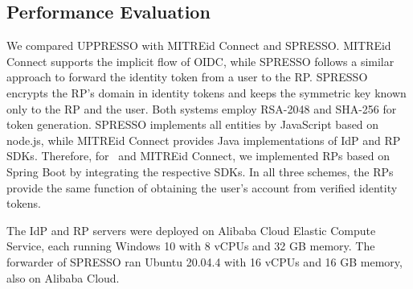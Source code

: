 \subsection{Performance Evaluation}
\label{sec:evaluation}


 We compared UPPRESSO with MITREid Connect and SPRESSO.
MITREid Connect supports the implicit flow of OIDC,
 while SPRESSO follows a similar approach to forward the identity token from a user to the RP.
 SPRESSO encrypts the RP's domain in identity tokens and keeps the symmetric key known only to the RP and the user. Both systems employ RSA-2048 and SHA-256 for token generation.
SPRESSO implements all entities by JavaScript based on node.js, while MITREid Connect provides Java implementations of IdP and RP SDKs.
Therefore, for \usso~and MITREid Connect, we implemented RPs based on Spring Boot by integrating the respective SDKs. In all three schemes, the RPs provide the same function of obtaining the user's account from verified identity tokens.

The IdP and RP servers were deployed on Alibaba Cloud Elastic Compute Service, each running Windows 10 with 8 vCPUs and 32 GB memory. The forwarder of SPRESSO ran Ubuntu 20.04.4 with 16 vCPUs and 16 GB memory, also on Alibaba Cloud.

